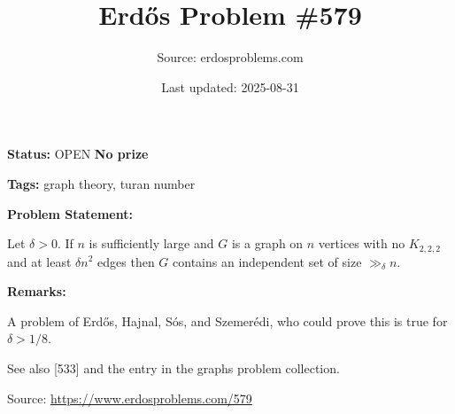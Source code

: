 \documentclass{article}
\title{Erd\H{o}s Problem \#579}
\date{Last updated: 2025-08-31}
\author{Source: erdosproblems.com}
\begin{document}
\maketitle

\noindent\textbf{Status:} OPEN \quad \textbf{No prize}

\noindent\textbf{Tags:} graph theory, turan number

\medskip
\noindent\textbf{Problem Statement:}

Let $\delta>0$. If $n$ is sufficiently large and $G$ is a graph on $n$ vertices with no $K_{2,2,2}$ and at least $\delta n^2$ edges then $G$ contains an independent set of size $\gg_\delta n$.

\bigskip
\noindent\textbf{Remarks:}

A problem of Erd\H{o}s, Hajnal, S\'{o}s, and Szemer\'{e}di, who could prove this is true for $\delta>1/8$.

See also [533] and the entry in the graphs problem collection.

\bigskip
\noindent\small{Source: \url{https://www.erdosproblems.com/579}}
\end{document}
